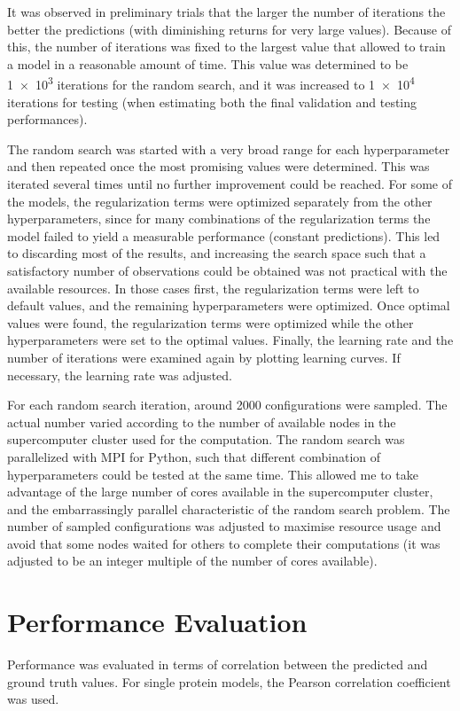 It was observed in preliminary trials that the larger the number of iterations the better the predictions (with diminishing returns for very large values).
Because of this, the number of iterations was fixed to the largest value that allowed to train a model in a reasonable amount of time.
This value was determined to be \num{1e3} iterations for the random search, and it was increased to \num{1e4} iterations for testing (when estimating both the final validation and testing performances).

The random search was started with a very broad range for each hyperparameter and then repeated once the most promising values were determined.
This was iterated several times until no further improvement could be reached.
For some of the models, the regularization terms were optimized separately from the other hyperparameters, since for many combinations of the regularization terms the model failed to yield a measurable performance (constant predictions).
This led to discarding most of the results, and increasing the search space such that a satisfactory number of observations could be obtained was not practical with the available resources.
In those cases first, the regularization terms were left to default values, and the remaining hyperparameters were optimized.
Once optimal values were found, the regularization terms were optimized while the other hyperparameters were set to the optimal values.
Finally, the learning rate and the number of iterations were examined again by plotting learning curves.
If necessary, the learning rate was adjusted.


For each random search iteration, around \num{2000} configurations were sampled.
The actual number varied according to the number of available nodes in the supercomputer cluster used for the computation.
The random search was parallelized with MPI for Python, such that different combination of hyperparameters could be tested at the same time.
This allowed me to take advantage of the large number of cores available in the supercomputer cluster, and the embarrassingly parallel characteristic of the random search problem.
The number of sampled configurations was adjusted to maximise resource usage and avoid that some nodes waited for others to complete their computations (it was adjusted to be an integer multiple of the number of cores available).

\section{Performance Evaluation}
Performance was evaluated in terms of correlation between the predicted and ground truth values.
For single protein models, the Pearson correlation coefficient was used.

